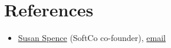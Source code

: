 \documentclass[letterpaper,11pt]{article}
\newcommand{\resumeSubHeadingListStart}{\begin{itemize}[leftmargin=0.15in, label={}]}
\newcommand{\resumeSubHeadingListEnd}{\end{itemize}}
\begin{document}
\section{References}
  \vspace{2pt}
  \resumeSubHeadingListStart
  \item{\href{https://www.linkedin.com/in/susan-spence-08a3062/}{Susan Spence} (SoftCo co-founder), \href{susan.spence7@gmail.com}{email}}
   \resumeSubHeadingListEnd



\end{document}
